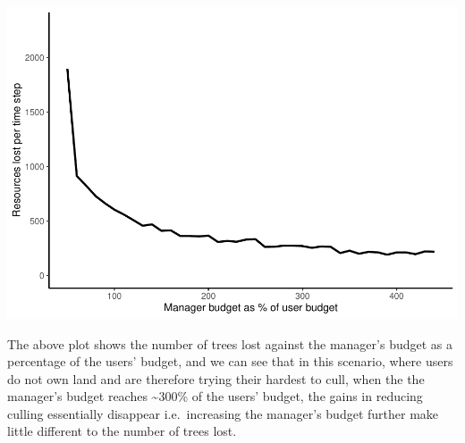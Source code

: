 \documentclass[
]{article}
\begin{document}
\includegraphics{gmse_tenure_ongoing_files/figure-latex/ten_rep_7 budget proportion plot-1.pdf}

The above plot shows the number of trees lost against the manager's
budget as a percentage of the users' budget, and we can see that in this
scenario, where users do not own land and are therefore trying their
hardest to cull, when the the manager's budget reaches
\textasciitilde300\% of the users' budget, the gains in reducing culling
essentially disappear i.e.~increasing the manager's budget further make
little different to the number of trees lost.
\end{document}
